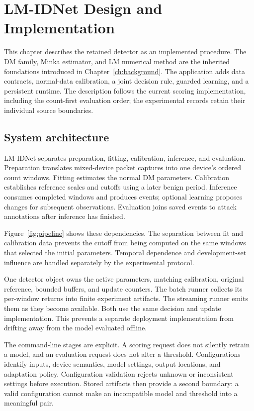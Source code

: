 \chapter{LM-IDNet Design and Implementation}
\label{ch:implementation}
This chapter describes the retained detector as an implemented procedure.
The DM family, Minka estimator, and LM numerical method are the inherited
foundations introduced in Chapter~\ref{ch:background}. The application adds
data contracts, normal-data calibration, a joint decision rule, guarded
learning, and a persistent runtime. The description follows the current
scoring implementation, including the count-first evaluation order; the
experimental records retain their individual source boundaries.

\section{System architecture}
\label{sec:architecture}

LM-IDNet separates preparation, fitting, calibration, inference, and
evaluation. Preparation translates mixed-device packet captures into one
device's ordered count windows. Fitting estimates the normal DM parameters.
Calibration establishes reference scales and cutoffs using a later benign
period. Inference consumes completed windows and produces events; optional
learning proposes changes for subsequent observations. Evaluation joins
saved events to attack annotations after inference has finished.

Figure~\ref{fig:pipeline} shows these dependencies. The separation between
fit and calibration data prevents the cutoff from being computed on the
same windows that selected the initial parameters. Temporal dependence and
development-set influence are handled separately by the experimental
protocol.



One detector object owns the active parameters, matching calibration,
original reference, bounded buffers, and update counters. The batch runner
collects its per-window returns into finite experiment artifacts. The
streaming runner emits them as they become available. Both use the same
decision and update implementation. This prevents a separate deployment
implementation from drifting away from the model evaluated offline.

The command-line stages are explicit. A scoring request does not silently
retrain a model, and an evaluation request does not alter a threshold.
Configurations identify inputs, device semantics, model settings, output
locations, and adaptation policy. Configuration validation rejects unknown
or inconsistent settings before execution. Stored artifacts then provide
a second boundary: a valid configuration cannot make an incompatible
model and threshold into a meaningful pair.

